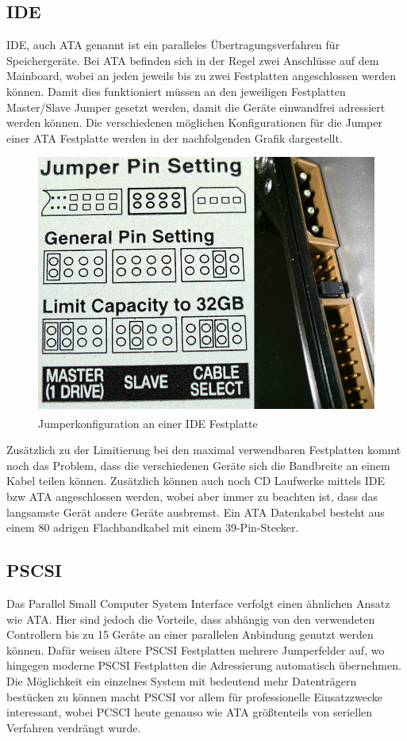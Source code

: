 \documentclass[a4paper, DIV20, 12pt, headsepline, parskip, flushleft]{scrartcl}
\begin{document}
\subsection{IDE}
IDE, auch ATA genannt ist ein paralleles Übertragungsverfahren für Speichergeräte.
Bei ATA befinden sich in der Regel zwei Anschlüsse auf dem Mainboard, wobei an jeden jeweils bis zu zwei Festplatten angeschlossen werden können. Damit dies funktioniert müssen an den jeweiligen Festplatten Master/Slave Jumper gesetzt werden, damit die Geräte einwandfrei adressiert werden können. Die verschiedenen möglichen Konfigurationen für die Jumper einer ATA Festplatte werden in der nachfolgenden Grafik dargestellt.
\begin{figure}[H]
\begin{center}
\includegraphics[scale=0.3]{IDEJumper.jpg}
\end{center}
\caption{Jumperkonfiguration an einer IDE Festplatte \textsuperscript{\cite{img:idejumper}}}
\end{figure}
Zusätzlich zu der Limitierung bei den maximal verwendbaren Festplatten kommt noch das Problem, dass die verschiedenen Geräte sich die Bandbreite an einem Kabel teilen können. Zusätzlich können auch noch CD Laufwerke mittels IDE bzw ATA angeschlossen werden, wobei aber immer zu beachten ist, dass das langsamste Gerät andere Geräte ausbremst.\newline
Ein ATA Datenkabel besteht aus einem 80 adrigen Flachbandkabel mit einem 39-Pin-Stecker.
\subsection{PSCSI}
Das Parallel Small Computer System Interface verfolgt einen ähnlichen Ansatz wie ATA. Hier sind jedoch die Vorteile, dass abhängig von den verwendeten Controllern bis zu 15 Geräte an einer parallelen Anbindung genutzt werden können. Dafür weisen ältere PSCSI Festplatten mehrere Jumperfelder auf, wo hingegen moderne PSCSI Festplatten die Adressierung automatisch übernehmen. \\
Die Möglichkeit ein einzelnes System mit bedeutend mehr Datenträgern bestücken zu können macht PSCSI vor allem für professionelle Einsatzzwecke interessant, wobei PCSCI heute genauso wie ATA größtenteils von seriellen Verfahren verdrängt wurde.
\end{document}
